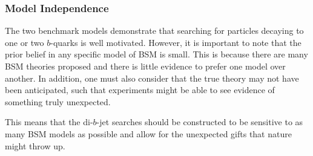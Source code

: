 \subsubsection{Model Independence}

The two benchmark models demonstrate that searching for particles decaying to one or two $b$-quarks is well motivated.
However, it is important to note that the prior belief in any specific model of BSM is small.
This is because there are many BSM theories proposed and there is little evidence to prefer one model over another.
In addition, one must also consider that the true theory may not have been anticipated, such that experiments might be able to see evidence of something truly unexpected.


This means that the di-$b$-jet searches should be constructed to be
sensitive to as many BSM models as possible
and allow for the unexpected gifts that nature might throw up.
